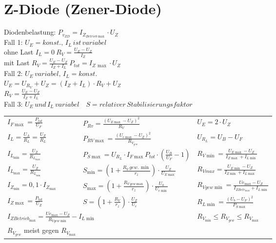 \section{Z-Diode (Zener-Diode)}\label{sec:zener-diode}
    Diodenbelastung: $P_{v_{ZD}}=I_{Z_{Betrieb\max}}\cdot U_Z$\\
    Fall 1: $U_E=konst.,\, I_L\, ist\, variabel$\\
    \hspace*{1cm} ohne Last $I_L=0\: R_V=\frac{U_E-U_Z}{I_Z}$\\
    \hspace*{1cm} mit Last $R_V=\frac{U_E-U_Z}{I_Z+I_L}\: P_{tot}=I_{Z\, \max}\cdot U_Z$\\
    Fall 2: $U_E\, variabel,\, I_L=konst.$\\
    \hspace*{1cm} $U_E=U_{R_V}+U_Z=(I_Z+I_L)\cdot R_V+U_Z$\\
    \hspace*{1cm} $R_V=\frac{U_E-U_Z}{I_Z+I_L}$\\
    Fall 3: $U_E\, und\, I_L\, variabel\quad S=relativer\, Stabilisierungsfaktor$
    \begin{table}[H]
        \renewcommand{\arraystretch}{1.2}
        \begin{tabularx}{\columnwidth}{l l l}%
            $I_{F\max}=\frac{P_{tot}}{U_F}$ &
            $P_{Rv}=\frac{(U_{E\max}-U_Z)^2}{R_V}$ &
            $U_E=2\cdot U_Z$
            \\
            $I_L=\frac{U_A}{R_L}=\frac{U_Z}{R_L}$ &
            $P_{RV\max}=\frac{\left(U_{e\max}-U_Z\right)^2}{R_{V_{gew}}}$ &
            $U_{R_L}=U_B-U_F$
            \\
            $I_{L_{\min}}=\frac{U_Z}{R_{L_{\max}}}$ &
            $P_{S\max}=U_{R_L}\cdot I_{F\max}P_{tot}\cdot\left(\frac{U_B}{U_F}-1\right)$ &
            $R_{V\min}=\frac{U_{E\max}-U_Z}{I_{Z\max}+I_{L\min}}$
            \\
            $I_{L_{\max}}=\frac{U_Z}{R_{L_{\min}}}$ &
            $S_{\min}=(1+\frac{R_V\,gew.\,\min}{r_z})\cdot\frac{U_Z}{U_{E\max}}$ &
            $R_{Vmax}=\frac{U_{E\min}-U_Z}{I_{Z\min}+I_{L\max}}$
            \\
            $I_{Z_{\min}}=0,1\cdot I_{Z_{\max}}$ &
            $S_{\max}=\left(1+\frac{R_{V\,gew\max}}{r_z}\right)\cdot\frac{U_a}{U_{e\min}}$ &
            $R_{Vgew\min}=\frac{U{e_{\max}}-U_Z}{I_{ZBetr_{\max}}+I_{L\min}}$
            \\
            $I_{Z\max}=\frac{P_{tot}}{U_Z}$ &
            $S=(1+\frac{R_V}{r_z})\cdot\frac{U_Z}{U_e}$ &
            $R_{L\min}=\frac{\left(U_b-U_F\right)^2}{P_{S\max}}$
            \\
            \multicolumn{2}{l}{$I_{Z{Betrieb_{\max}}}=\frac{U{e_{\max}}-U_Z}{R_{Vgew\min}}-I_{L\min}$} &
            $R_{V_{\min}}\leq R_{V_{gew}} \leq R_{V_{\max}}$
            \\
            $R_{V_{gew}}$ meist gegen $R_{V_{\max}}$
        \end{tabularx}
    \end{table}
